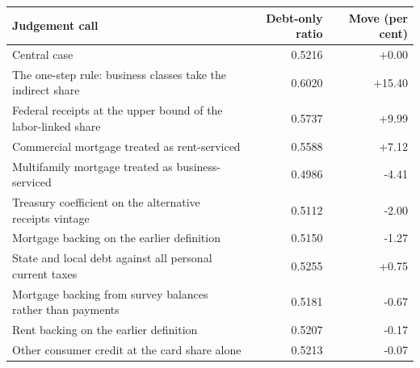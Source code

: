 \begin{tabular}{lrr}
\toprule
Judgement call & Debt-only ratio & Move (per cent) \\
\midrule
Central case & 0.5216 & +0.00 \\
The one-step rule: business classes take the indirect share & 0.6020 & +15.40 \\
Federal receipts at the upper bound of the labor-linked share & 0.5737 & +9.99 \\
Commercial mortgage treated as rent-serviced & 0.5588 & +7.12 \\
Multifamily mortgage treated as business-serviced & 0.4986 & -4.41 \\
Treasury coefficient on the alternative receipts vintage & 0.5112 & -2.00 \\
Mortgage backing on the earlier definition & 0.5150 & -1.27 \\
State and local debt against all personal current taxes & 0.5255 & +0.75 \\
Mortgage backing from survey balances rather than payments & 0.5181 & -0.67 \\
Rent backing on the earlier definition & 0.5207 & -0.17 \\
Other consumer credit at the card share alone & 0.5213 & -0.07 \\
\bottomrule
\end{tabular}
